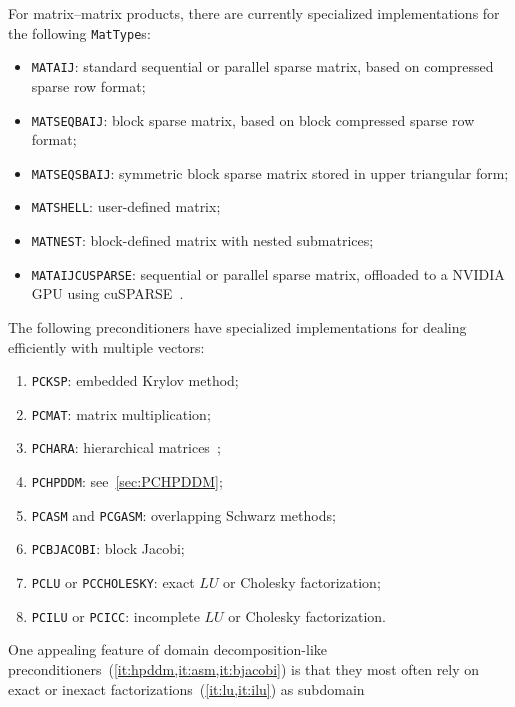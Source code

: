 \documentclass[3p,11pt]{elsarticle}
\newcommand{\pk}[1]{\texttt{#1}}
\begin{document}
For matrix--matrix products, there are
currently specialized implementations for the following \pk{MatType}s:
\begin{itemize}
    \item \pk{MATAIJ}: standard sequential or parallel sparse matrix, based on compressed sparse row format;
    \item \pk{MATSEQBAIJ}: block sparse matrix, based on block compressed sparse row format;
    \item \pk{MATSEQSBAIJ}: symmetric block sparse matrix stored in upper triangular form;
    \item \pk{MATSHELL}: user-defined matrix;
    \item \pk{MATNEST}: block-defined matrix with nested submatrices;
    \item \pk{MATAIJCUSPARSE}: sequential or parallel sparse matrix, offloaded to a NVIDIA GPU using cuSPARSE~\cite{cusparse-web-page}.
\end{itemize}
The following preconditioners have specialized implementations for dealing
efficiently with multiple vectors:
\begin{enumerate}
    \item \pk{PCKSP}: embedded Krylov method;
    \item \pk{PCMAT}: matrix multiplication;
    \item \pk{PCHARA}: hierarchical matrices~\cite{10.1145/3232850,ambartsumyan2020hierarchical}; 
    \item \pk{PCHPDDM}: see~\cref{sec:PCHPDDM};\label{it:hpddm}
    \item \pk{PCASM} and \pk{PCGASM}: overlapping Schwarz methods;\label{it:asm}
    \item \pk{PCBJACOBI}: block Jacobi;\label{it:bjacobi}
    \item \pk{PCLU} or \pk{PCCHOLESKY}: exact $LU$ or Cholesky factorization;\label{it:lu}
    \item \pk{PCILU} or \pk{PCICC}: incomplete $LU$ or Cholesky
        factorization.\label{it:ilu}
\end{enumerate}
One appealing feature of domain decomposition-like
preconditioners~(\cref{it:hpddm,it:asm,it:bjacobi}) is that they most often
rely on exact or inexact factorizations~(\cref{it:lu,it:ilu}) as subdomain
\end{document}
